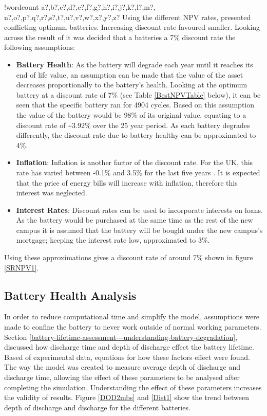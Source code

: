 \documentclass[fontsize=9.5pt]{extarticle}
\numberwithin{figure}{section} %
\providecommand{\tightlist}{%
  \setlength{\itemsep}{0pt}\setlength{\parskip}{0pt}}
\newcounter{words}
\newenvironment{counted}{%
  \setcounter{words}{0}
  \SearchList!{wordcount}{\stepcounter{words}}
    {a?,b?,c?,d?,e?,f?,g?,h?,i?,j?,k?,l?,m?,
    n?,o?,p?,q?,r?,s?,t?,u?,v?,w?,x?,y?,z?}
  \UndoBoundary{'}
  \SearchOrder{p;}}{%
  \StopSearching}
\begin{document}
\begin{counted}
Using the different NPV rates, presented conflicting optimum batteries.
Increasing discount rate favoured smaller. Looking across the result of
it was decided that a batteries a 7\% discount rate the following
assumptions:

\begin{itemize}
\tightlist
\item
  \textbf{Battery Health}: As the battery will degrade each year until
  it reaches its end of life value, an assumption can be made that the
  value of the asset decreases proportionally to the battery's health.
  Looking at the optimum battery at a discount rate of 7\% (see Table
  \ref{BestNPVTable} below), it can be seen that the specific battery
  ran for 4904 cycles. Based on this assumption the value of the battery
  would be 98\% of its original value, equating to a discount rate of
  \textasciitilde{}3.92\% over the 25 year period. As each battery
  degrades differently, the discount rate due to battery healthy can be
  approximated to 4\%.
\item
  \textbf{Inflation}: Inflation is another factor of the discount rate.
  For the UK, this rate has varied between -0.1\% and 3.5\% for the last
  five years \cite{UnitedKi95:online}. It is expected that the price of
  energy bills will increase with inflation, therefore this interest was
  neglected.
\item
  \textbf{Interest Rates}: Discount rates can be used to incorporate
  interests on loans. As the battery would be purchased at the same time
  as the rest of the new campus it is assumed that the battery will be
  bought under the new campus's mortgage; keeping the interest rate low,
  approximated to 3\%.
\end{itemize}

Using these approximations gives a discount rate of around 7\% shown in
figure \ref{SRNPV1}.

\subsection{Battery Health Analysis}\label{battery-health-analysis}

In order to reduce computational time and simplify the model,
assumptions were made to confine the battery to never work outside of
normal working parameters. Section
\ref{battery-lifetime-assessment---understanding-battery-degradation},
discussed how discharge time and depth of discharge effect the battery
lifetime. Based of experimental data, equations for how these factors
effect were found. The way the model was created to measure average
depth of discharge and discharge time, allowing the effect of these
parameters to be analysed after completing the simulation. Understanding
the effect of these parameters increases the validity of results. Figure
\ref{DOD2mbs} and \ref{Dist1} show the trend between depth of discharge
and discharge for the different batteries.


\end{counted}
\end{document}

